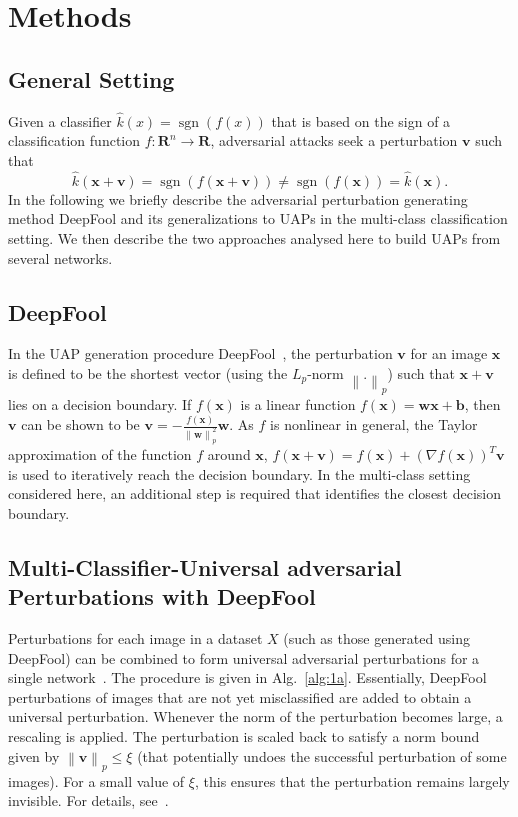 \documentclass[runningheads]{llncs}
\DeclareMathOperator{\sgn}{sgn}
\newcommand{\xb}{\ensuremath{\mathbf{x}}}
\newcommand{\vb}{\ensuremath{\mathbf{v}}}
\begin{document}
\section{Methods}\label{sec:methods}
\subsection{General Setting}
Given a classifier \(\hat{k}(x)=\sgn\left(f(x)\right)\) that is based on the sign of a classification function \(f:\mathbf{R}^n\rightarrow\mathbf{R}\), adversarial attacks seek a perturbation \(\vb\) such that \[\hat{k}(\xb+\vb)=\sgn\left(f(\xb+\vb)\right)\neq \sgn\left(f(\xb)\right)=\hat{k}(\xb).\] 
In the following we briefly describe the adversarial perturbation generating method DeepFool and its generalizations to UAPs in the multi-class classification setting. We then describe the two approaches analysed here to build UAPs from several networks. 

\subsection{DeepFool}
%
In the UAP generation procedure DeepFool~\cite{moosavi-dezfooli_deepfool_2016}, the perturbation \(\mathbf{v}\) for an image \(\xb\) is defined to be the shortest vector (using the \(L_p\)-norm \(\left\|.\right\|_p\)) such that \(\xb+\mathbf{v}\) lies on a decision boundary. 
If $f(\xb)$ is a linear function $f(\xb)=\mathbf{w} \xb+\mathbf{b}$, then \(\mathbf{v}\) can be shown to be \(\mathbf{v}=-\frac{f(\xb)}{\left\|\mathbf{w}\right\|_p^2}\mathbf{w}\). As \(f\) is nonlinear in general, the Taylor approximation of the function $f$ around \(\mathbf{x}\), \(f(\mathbf{x}+\mathbf{v})=f(\mathbf{x})+\left(\nabla f(\mathbf{x})\right)^T\mathbf{v}\) is used to iteratively reach the decision boundary. 
In the multi-class setting considered here, an additional step is required that identifies the closest decision boundary. 

\subsection{Multi-Classifier-Universal adversarial Perturbations with DeepFool}\label{sec:MultUAP}

Perturbations for each image in a dataset \(X\) (such as those generated using DeepFool) can be combined to form universal adversarial perturbations for a single network~\cite{moosavidezfooli_universal_2017}. The procedure is given in Alg.~\ref{alg:1a}. Essentially, DeepFool perturbations of images that are not yet misclassified are added to obtain a universal perturbation. 
Whenever the norm of the perturbation becomes large, a rescaling is applied. The perturbation is scaled back to satisfy a norm bound given by \(\left\|\mathbf{v}\right\|_p\leq\xi\) (that potentially undoes the successful perturbation of some images). For a small value of \(\xi\), this ensures that the perturbation remains largely invisible. For details, see~\cite{moosavidezfooli_universal_2017}. 
\end{document}
